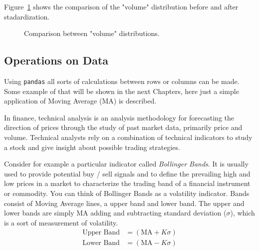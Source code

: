 Figure~\ref{fig:standardization} shows the comparison of the "volume" distribution before and after stadardization.

\begin{figure}[htb]
	\centering
	\caption{Comparison between "volume" distributions.}
	\label{fig:standardization}
\end{figure}

\subsection{Operations on Data}
Using \texttt{pandas} all sorts of calculations between rows or columns can be made. Some example of that will be shown in the next Chapters, here just a simple application of Moving Average (MA) is described.

In finance, technical analysis is an analysis methodology for forecasting the direction of prices through the study of past market data, primarily price and volume. Technical analysts rely on a combination of technical indicators to study a stock and give insight about possible trading strategies. 

Consider for example a particular indicator called \emph{Bollinger Bands}. It is usually used to provide potential buy / sell signals and to define the prevailing high and low prices in a market to characterize the trading band of a financial instrument or commodity. You can think of Bollinger Bands as a volatility indicator. Bands consist of Moving Average lines, a upper band and lower band. The upper and lower bands are simply MA adding and subtracting standard deviation ($\sigma$), which is a sort of  measurement of volatility. 
\[
\begin{split}
\textrm{Upper Band} & = (\textrm{MA} + K\sigma)\\
\textrm{Lower Band} & = (\textrm{MA} − K\sigma)
\end{split}
\]


